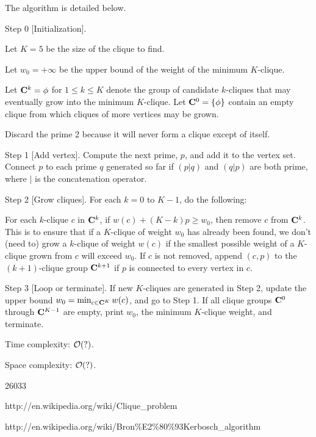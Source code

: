 The algorithm is detailed below.

Step 0 [Initialization]. 

Let $K = 5$ be the size of the clique to find. 

Let $w_0 = +\infty$ be the upper bound of the weight of the minimum $K$-clique. 

Let $\mathbf{C}^k = \phi$ for $1 \le k \le K$ denote the group of candidate $k$-cliques that may eventually grow into the minimum $K$-clique. Let $\mathbf{C}^0 = \{ \phi \}$ contain an empty clique from which cliques of more vertices may be grown.

Discard the prime 2 because it will never form a clique except of itself.

Step 1 [Add vertex]. Compute the next prime, $p$, and add it to the vertex set. Connect $p$ to each prime $q$ generated so far if $(p | q)$ and $(q | p)$ are both prime, where $|$ is the concatenation operator.

Step 2 [Grow cliques]. For each $k = 0$ to $K-1$, do the following:

For each $k$-clique $c$ in $\mathbf{C}^k$, if $w(c) + (K-k)p \ge w_0$, then remove $c$ from $\mathbf{C}^k$. This is to ensure that if a $K$-clique of weight $w_0$ has already been found, we don't (need to) grow a $k$-clique of weight $w(c)$ if the smallest possible weight of a $K$-clique grown from $c$ will exceed $w_0$. If $c$ is not removed, append $(c,p)$ to the $(k+1)$-clique group $\mathbf{C}^{k+1}$ if $p$ is connected to every vertex in $c$.

Step 3 [Loop or terminate]. If new $K$-cliques are generated in Step 2, update the upper bound $w_0 = \min_{c \in \mathbf{C}^K} w(c)$, and go to Step 1. If all clique groups $\mathbf{C}^0$ through $\mathbf{C}^{K-1}$ are empty, print $w_0$, the minimum $K$-clique weight, and terminate.

\complexity

Time complexity: $\mathcal{O}(?)$.

Space complexity: $\mathcal{O}(?)$.

\answer

26033


http://en.wikipedia.org/wiki/Clique\_problem

http://en.wikipedia.org/wiki/Bron\%E2\%80\%93Kerbosch\_algorithm



 